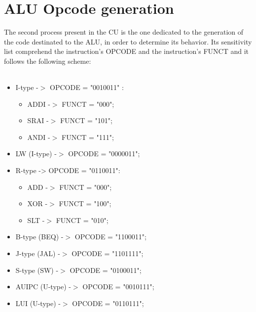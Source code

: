 \section{ALU Opcode generation}
The second process present in the CU is the one dedicated to the generation of the code destinated to the ALU, in order to determine its behavior.
Its sensitivity list comprehend the instruction's OPCODE and the instruction's FUNCT and it follows the following scheme:\\
\\
\begin{itemize}
	\item I-type -$>$ OPCODE = "0010011" :
		\begin{itemize}
			\item ADDI -$>$ FUNCT = "000";
			\item SRAI -$>$ FUNCT = "101";
			\item ANDI -$>$ FUNCT = "111";
		\end{itemize}
	\item LW (I-type) -$>$ OPCODE = "0000011";
	\item R-type -> OPCODE = "0110011":
		\begin{itemize}
			\item ADD -$>$ FUNCT = "000";
			\item XOR -$>$ FUNCT = "100";
			\item SLT -$>$ FUNCT = "010";
		\end{itemize}
	\item B-type (BEQ) -$>$ OPCODE = "1100011";
	\item J-type (JAL) -$>$ OPCODE = "1101111";
	\item S-type (SW) -$>$ OPCODE = "0100011";
	\item AUIPC (U-type) -$>$ OPCODE = "0010111";
	\item LUI (U-type) -$>$ OPCODE = "0110111";		
\end{itemize}